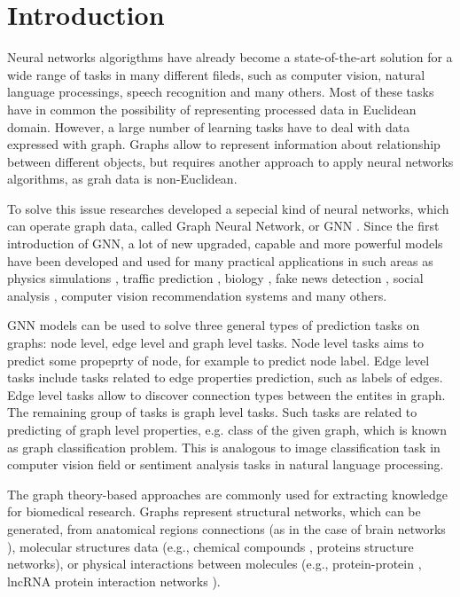 \section{Introduction}


Neural networks algorigthms have already become a state-of-the-art solution for a wide range of tasks
in many different fileds, such as computer vision, natural language processings, speech recognition and many others.
Most of these tasks have in common the possibility of representing processed data in Euclidean domain. However,
a large number of learning tasks have to deal with data expressed with graph. Graphs allow 
to represent information about relationship between different objects, but requires another approach 
to apply neural networks algorithms, as grah data is non-Euclidean. 

To solve this issue researches developed a sepecial kind of neural networks, which can operate graph data, called 
Graph Neural Network, or GNN \cite{GNN}. Since the first introduction of GNN, a lot of new upgraded, capable and more powerful 
models have been developed and used for many practical applications in such areas as
physics simulations \cite{physics}, traffic prediction \cite{traffic}, biology\cite{biology1} \cite{biology2},
fake news detection \cite{fakenews}, social analysis \cite{social}, computer vision \cite{cv1} \cite{cv2}
recommendation systems \cite{reccomend} and many others. 

GNN models can be used to solve three general types of prediction tasks on graphs: 
node level, edge level and graph level tasks. Node level tasks aims to predict some propeprty of node, for example
to predict node label. Edge level tasks include tasks related to edge properties prediction, such as labels of edges. 
Edge level tasks allow to discover connection types between the entites in graph. The remaining group of tasks is graph level tasks.
Such tasks are related to predicting of graph level properties, e.g. class of the given graph, which is known as
graph classification problem. This is analogous to image classification task in computer vision field or
sentiment analysis tasks in natural language processing.

The graph theory-based approaches are commonly used for extracting knowledge 
for biomedical research. Graphs represent structural networks, which can be generated,
from anatomical regions connections (as in the case of brain networks \cite{intro_brain}),
molecular structures data (e.g., chemical compounds \cite{intro_2}, proteins structure \cite{intro_3} networks), or physical interactions between
molecules (e.g., protein-protein \cite{intro_4}, lncRNA protein interaction networks \cite{intro_5}). 

